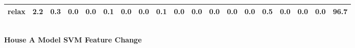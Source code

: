 \documentclass{article}
\begin{document}
\begin{sideways}
\begin{tabular}{lrrrrrrrrrrrrrrrrrr}
relax                         &         2.2 &                0.3 &           0.0 &                          0.0 &                0.1 &                0.0 &                        0.0 &          0.1 &              0.0 &                0.0 &                    0.0 &                      0.0 &                  0.0 &                   0.5 &              0.0 &              0.0 &                                  0.0 &         96.7 \\
\bottomrule
\end{tabular}
\end{sideways}
\normalsize
\vspace{1cm}\\
\textbf{House A Model SVM Feature Change}\\
\vspace{1cm}\\
\end{document}
